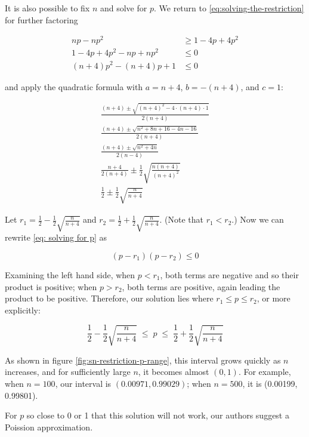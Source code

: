 \documentclass{article}
\begin{document}
It is also possible to fix $n$ and solve for $p$. We return to
\eqref{eq:solving-the-restriction} for further factoring

\begin{align}
  np - np^2 &\geq 1 - 4p + 4p^2 \nonumber \\
  1 - 4p + 4p^2 - np + np^2 &\leq 0 \nonumber \\
  (n+4)p^2 - (n+4)p + 1 &\leq 0 \label{eq: solving for p}
\end{align}

and apply the quadratic formula with $a = n+4$, $b = -(n+4)$, and $c = 1$:

\begin{gather*}
  \frac{(n+4) \pm \sqrt{(n+4)^2 - 4 \cdot (n+4) \cdot 1}}{2(n+4)} \\
  \frac{(n+4) \pm \sqrt{n^2 + 8n + 16 - 4n - 16}}{2(n+4)} \\
  \frac{(n+4) \pm \sqrt{n^2 + 4n}}{2(n-4)} \\
  \frac{n+4}{2(n+4)} \pm \frac12 \sqrt{\frac{n(n+4)}{(n+4)^2}} \\
  \frac12 \pm \frac12 \sqrt{\frac{n}{n+4}}
\end{gather*}

Let $r_1 = \frac12 - \frac12 \sqrt{\frac{n}{n+4}}$ and $r_2 = \frac12 + \frac12
\sqrt{\frac{n}{n+4}}$. (Note that $r_1 < r_2$.) Now we can rewrite \eqref{eq:
solving for p} as

\begin{equation*}
  (p - r_1)(p - r_2) \leq 0
\end{equation*}

Examining the left hand side, when $p < r_1$, both terms are negative and so
their product is positive; when $p > r_2$, both terms are positive, again
leading the product to be positive. Therefore, our solution lies where $r_1
\leq p \leq r_2$, or more explicitly:

\begin{equation}
 \frac12 - \frac12 \sqrt{\frac{n}{n+4}} \; \leq \; p \; \leq \; \frac12 + \frac12 \sqrt{\frac{n}{n+4}}
\end{equation}

As shown in figure \ref{fig:sn-restriction-p-range}, this interval grows
quickly as $n$ increases, and for sufficiently large $n$, it becomes almost
$(0, 1)$. For example, when $n=100$, our interval is $(0.00971, 0.99029)$; when
$n=500$, it is (0.00199, 0.99801).

For $p$ so close to 0 or 1 that this solution will not work, our authors
suggest a Poission approximation.
\end{document}
